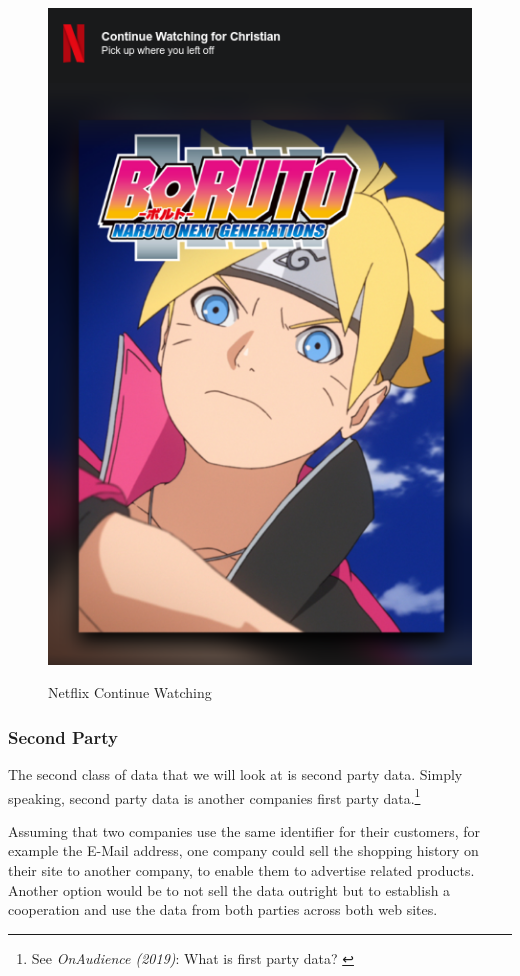 \begin{figure}[H]
\centering
\caption {Netflix Continue Watching}
\includegraphics[scale=0.6]{images/continue-boruto.png}
\label{fig:boruto}
\end{figure}

\subsubsection{Second Party}

The second class of data that we will look at is second party data. Simply speaking, second party data is another companies first party data.\footnote{See \textit{OnAudience (2019)}: What is first party data? \cite{firstParty}}

Assuming that two companies use the same identifier for their customers, for example the E-Mail address, one company could sell the shopping history on their site to another company, to enable them to advertise related products. Another option would be to not sell the data outright but to establish a cooperation and use the data from both parties across both web sites.

